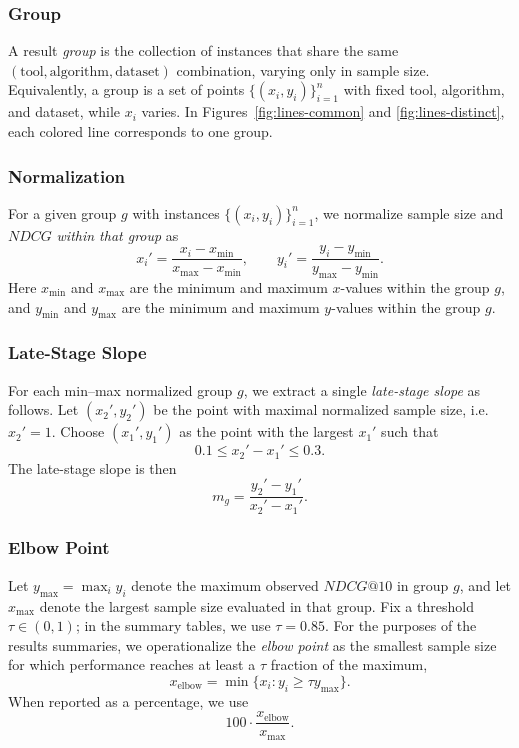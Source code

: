 \documentclass[12pt,a4paper]{article}
\begin{document}
\subsubsection{Group}
A result \emph{group} is the collection of instances that share the same
$(\text{tool}, \text{algorithm}, \text{dataset})$ combination, varying only in sample size.
Equivalently, a group is a set of points $\{(x_i, y_i)\}_{i=1}^n$ with fixed
tool, algorithm, and dataset, while $x_i$ varies.
In Figures~\ref{fig:lines-common} and \ref{fig:lines-distinct}, each colored line corresponds to one group.

\subsubsection{Normalization}
For a given group $g$ with instances $\{(x_i, y_i)\}_{i=1}^n$, we normalize sample size and
$NDCG$ \emph{within that group} as
\[
x_i'=\frac{x_i-x_{\min}}{x_{\max}-x_{\min}},
\qquad
y_i'=\frac{y_i-y_{\min}}{y_{\max}-y_{\min}} .
\]
Here \(x_{\min}\) and \(x_{\max}\) are the minimum and maximum \(x\)-values within the group \(g\),
and \(y_{\min}\) and \(y_{\max}\) are the minimum and maximum \(y\)-values within the group \(g\).

\subsubsection{Late-Stage Slope}
For each min--max normalized group $g$, we extract a single \emph{late-stage slope} as follows.
Let $(x_2', y_2')$ be the point with maximal normalized sample size, i.e. $x_2' = 1$.
Choose $(x_1', y_1')$ as the point with the largest $x_1'$ such that
\[
0.1 \le x_2' - x_1' \le 0.3.
\]
The late-stage slope is then
\[
m_g = \frac{y_2' - y_1'}{x_2' - x_1'}.
\]

\subsubsection{Elbow Point}
Let $y_{\max} = \max_i y_i$ denote the maximum observed $NDCG@10$ in group $g$, and let $x_{\max}$ denote the largest sample size evaluated in that group. Fix a threshold $\tau \in (0,1)$; in the summary tables, we use $\tau = 0.85$. For the purposes of the results summaries, we operationalize the \emph{elbow point} as the smallest sample size for which performance reaches at least a $\tau$ fraction of the maximum,
\[
x_{\mathrm{elbow}} = \min\{x_i : y_i \ge \tau y_{\max}\}.
\]
When reported as a percentage, we use
\[
100 \cdot \frac{x_{\mathrm{elbow}}}{x_{\max}}.
\]
\end{document}
